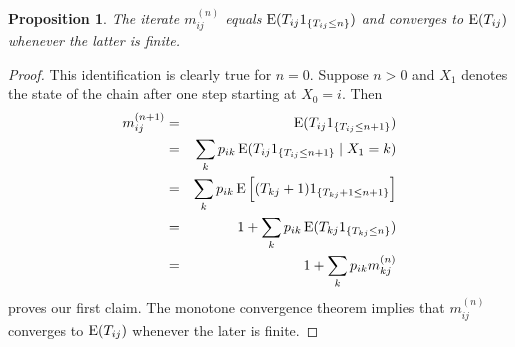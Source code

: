 \documentclass[11pt]{article}
\newtheorem{proposition}{Proposition}[section]
\def\E{\mathop{\rm E\,\!}\nolimits}
\begin{document}
\begin{proposition}
The iterate $m_{ij}^{(n)}$ equals $\E(T_{ij}1_{\{T_{ij}\le n\}})$
and converges to $\E(T_{ij})$ whenever the latter is finite.
\end{proposition}
\begin{proof}
This identification is clearly true for $n=0$. Suppose $n>0$ and $X_1$ denotes the state of the chain after one step starting at $X_0=i$. Then 
\begin{eqnarray*}
m_{ij}^{(n+1)} & = & \E(T_{ij}1_{\{T_{ij}\le n+1\}}) \\
& = & \sum_{k} p_{ik} 
\E(T_{ij}1_{\{T_{ij}\le n+1\}} \mid X_1 = k) \\
& = & \sum_{k} p_{ik} 
\E\Big[(T_{kj}+1)1_{\{T_{kj}+1\le n+1\}}\Big] \\
& = & 1+ \sum_{k} p_{ik}\E(T_{kj}1_{\{T_{kj}\le n\}})\\
& = & 1+ \sum_{k} p_{ik}m_{kj}^{(n)}
\end{eqnarray*}
proves our first claim. The monotone convergence theorem implies that 
$m_{ij}^{(n)}$ converges to $\E(T_{ij})$ whenever the later is finite.
\end{proof} 
\end{document}
